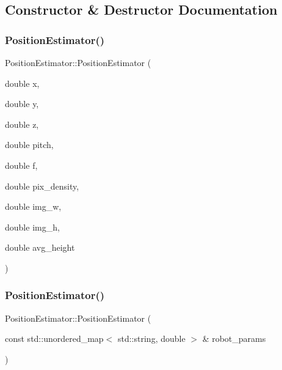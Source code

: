 \subsection{Constructor \& Destructor Documentation}
\mbox{\label{class_position_estimator_a162766d49cc6acd2ff0bb59737ec75c9}} 
\subsubsection{\texorpdfstring{Position\+Estimator()}{PositionEstimator()}\hspace{0.1cm}{\footnotesize\ttfamily [1/2]}}
{\footnotesize\ttfamily Position\+Estimator\+::\+Position\+Estimator (\begin{DoxyParamCaption}\item[{double}]{x,  }\item[{double}]{y,  }\item[{double}]{z,  }\item[{double}]{pitch,  }\item[{double}]{f,  }\item[{double}]{pix\+\_\+density,  }\item[{double}]{img\+\_\+w,  }\item[{double}]{img\+\_\+h,  }\item[{double}]{avg\+\_\+height }\end{DoxyParamCaption})\hspace{0.3cm}{\ttfamily [inline]}}

\mbox{\label{class_position_estimator_af0b8305de010b7f15f0b18499d8d50c3}} 
\subsubsection{\texorpdfstring{Position\+Estimator()}{PositionEstimator()}\hspace{0.1cm}{\footnotesize\ttfamily [2/2]}}
{\footnotesize\ttfamily Position\+Estimator\+::\+Position\+Estimator (\begin{DoxyParamCaption}\item[{const std\+::unordered\+\_\+map$<$ std\+::string, double $>$ \&}]{robot\+\_\+params }\end{DoxyParamCaption})\hspace{0.3cm}{\ttfamily [inline]}}



